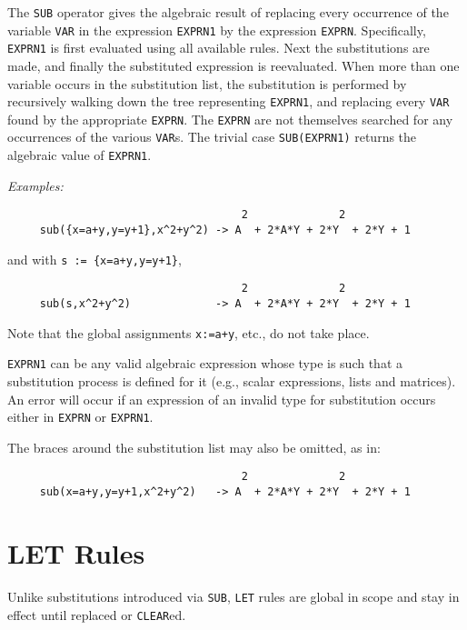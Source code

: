 The {\tt SUB} operator gives the algebraic result of replacing every
occurrence of the variable {\tt VAR} in the expression {\tt EXPRN1} by the
expression {\tt EXPRN}.  Specifically, {\tt EXPRN1} is first evaluated
using all available rules.  Next the substitutions are made, and finally
the substituted expression is reevaluated.  When more than one variable
occurs in the substitution list, the substitution is performed by
recursively walking down the tree representing {\tt EXPRN1}, and replacing
every {\tt VAR} found by the appropriate {\tt EXPRN}.  The {\tt EXPRN} are
not themselves searched for any occurrences of the various {\tt VAR}s.
The trivial case {\tt SUB(EXPRN1)} returns the algebraic value of
{\tt EXPRN1}.

{\it Examples:}
\begin{verbatim}
                                    2              2
     sub({x=a+y,y=y+1},x^2+y^2) -> A  + 2*A*Y + 2*Y  + 2*Y + 1
\end{verbatim}
and with {\tt s := \{x=a+y,y=y+1\}},
\begin{verbatim}
                                    2              2
     sub(s,x^2+y^2)             -> A  + 2*A*Y + 2*Y  + 2*Y + 1
\end{verbatim}

Note that the global assignments {\tt x:=a+y}, etc., do not take place.

{\tt EXPRN1} can be any valid algebraic expression whose type is such that
a substitution process is defined for it (e.g., scalar expressions, lists
and matrices).  An error will occur if an expression of an invalid type
for substitution occurs either in {\tt EXPRN} or {\tt EXPRN1}.

The braces around the substitution list may also be omitted, as in:

\begin{verbatim}
                                    2              2
     sub(x=a+y,y=y+1,x^2+y^2)   -> A  + 2*A*Y + 2*Y  + 2*Y + 1
\end{verbatim}

\section{LET Rules}
Unlike substitutions introduced via {\tt SUB}, {\tt LET}
rules are global in scope and stay in effect until replaced or {\tt CLEAR}ed.

